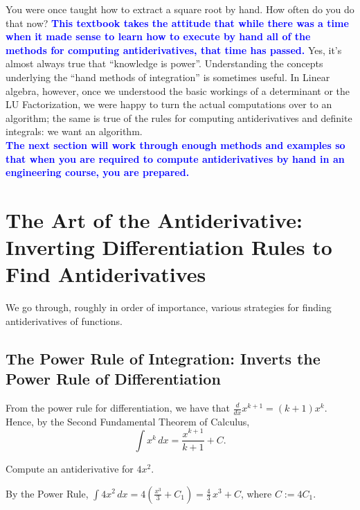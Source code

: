 You were once taught how to extract a square root by hand. How often do you do that now? \textcolor{blue}{\bf This textbook takes the attitude that while there was a time when it made sense to learn how to execute by hand all of the methods for computing antiderivatives, that time has passed.} Yes, it's almost always true that ``knowledge is power''. Understanding the concepts underlying the ``hand methods of integration'' is sometimes useful. In Linear algebra, however, once we understood the basic workings of a determinant or the LU Factorization, we were happy to turn the actual computations over to an algorithm; the same is true of the rules for computing antiderivatives and definite integrals: we want an algorithm. \\

\textcolor{blue}{\bf The next section will work through enough methods and examples so that when you are required to compute antiderivatives by hand in an engineering course, you are prepared.} 

\section{The Art of the Antiderivative: Inverting Differentiation Rules to Find Antiderivatives}

We go through, roughly in order of importance, various strategies for finding antiderivatives of functions. 

\subsection{The Power Rule of Integration: Inverts the Power Rule of Differentiation}

From the power rule for differentiation, we have that $\frac{d}{dx} x^{k+1} = (k+1)x^{k}$. Hence, by the Second Fundamental Theorem of Calculus,
\begin{equation}
    \label{eq:PowerRuleIntegration}
    \int x^{k}\, dx = \frac{x^{k+1}}{k+1} + C.
\end{equation}

\bigskip

\begin{example}
Compute an antiderivative for  $4 x^2$.
\end{example}
\solution By the Power Rule, $ \int 4 x^2 \, dx = 4 \left( \frac{x^3}{3} + C_1 \right) =  \frac{4}{3} \, x^3 + C$, where $C:=4 C_1$.
\Qed

\bigskip


